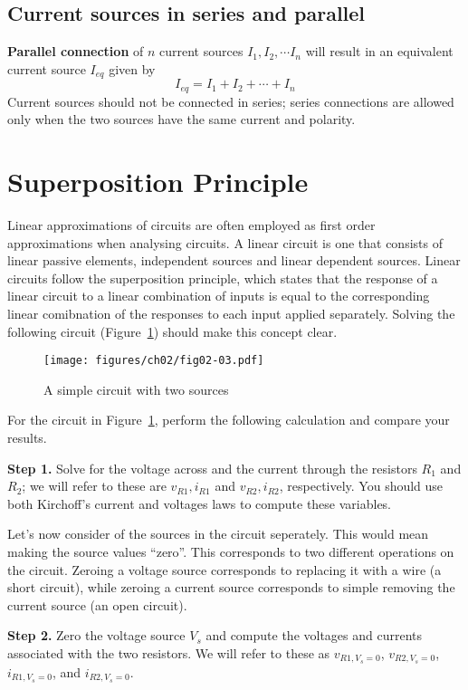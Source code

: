 \subsection{Current sources in series and parallel}
\noindent\textbf{Parallel connection} of $n$ current sources $I_1, I_2, \cdots I_n$ will
result in an equivalent current source $I_{eq}$ given by
\begin{equation}
    I_{eq} = I_1 + I_2 + \cdots + I_n
    \label{eq:02-20}
\end{equation}
Current sources should not be connected in series; series connections are allowed only when the two sources have the same current and polarity.

\section{Superposition Principle}
Linear approximations of circuits are often employed as first order approximations when analysing circuits. A linear circuit is one that consists of linear passive elements, independent sources and linear dependent sources. Linear circuits follow the superposition principle, which states that the response of a linear circuit to a linear combination of inputs is equal to the corresponding linear comibnation of the responses to each input applied separately. Solving the following circuit (Figure~\ref{fig:02-03}) should make this concept clear.
\begin{figure}[t]
    \centering
    \texttt{[image: figures/ch02/fig02-03.pdf]}
    \caption{A simple circuit with two sources}
    \label{fig:02-03}
\end{figure}
For the circuit in Figure~\ref{fig:02-03}, perform the following calculation and compare your results.

\noindent\textbf{Step 1.} Solve for the voltage across and the current through the resistors $R_1$ and $R_2$; we will refer to these are $v_{R1}, i_{R1}$ and $v_{R2}, i_{R2}$, respectively. You should use both Kirchoff's current and voltages laws to compute these variables.

\noindent Let's now consider of the sources in the circuit seperately. This would mean making the source values ``zero''. This corresponds to two different operations on the circuit. Zeroing a voltage source corresponds to replacing it with a wire (a short circuit), while zeroing a current source corresponds to simple removing the current source (an open circuit). 

\noindent\textbf{Step 2.} Zero the voltage source $V_s$ and compute the voltages and currents associated with the two resistors. We will refer to these as $v_{R1,V_s=0}$, $v_{R2,V_s=0}$, $i_{R1,V_s=0}$, and $i_{R2,V_s=0}$.


